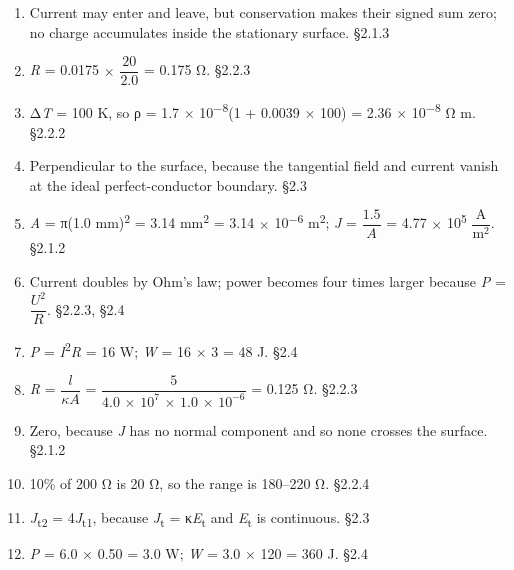 \documentclass[11pt]{article}
\begin{document}
\begin{keepsection}
\begin{enumerate}
\item Current may enter and leave, but conservation makes their signed sum zero; no charge accumulates inside the stationary surface. \hfill{\small\color{FAUblue}§2.1.3}
\item \textit{R} = 0.0175 \ensuremath{\times} {\small\ensuremath{\dfrac{20}{2.0}}} = 0.175 Ω. \hfill{\small\color{FAUblue}§2.2.3}
\item Δ\textit{T} = 100 K, so ρ = 1.7 \ensuremath{\times} 10\textsuperscript{\ensuremath{-}8}(1 + 0.0039 \ensuremath{\times} 100) = 2.36 \ensuremath{\times} 10\textsuperscript{\ensuremath{-}8} Ω m. \hfill{\small\color{FAUblue}§2.2.2}
\item Perpendicular to the surface, because the tangential field and current vanish at the ideal perfect-conductor boundary. \hfill{\small\color{FAUblue}§2.3}
\item \textit{A} = π(1.0 mm)\textsuperscript{2} = 3.14 mm\textsuperscript{2} = 3.14 \ensuremath{\times} 10\textsuperscript{\ensuremath{-}6} m\textsuperscript{2}; \textit{J} = {\small\ensuremath{\dfrac{1.5}{{A}}}} = 4.77 \ensuremath{\times} 10\textsuperscript{5} {\small\ensuremath{\dfrac{\mathrm{A}}{\mathrm{m}^{2}}}}. \hfill{\small\color{FAUblue}§2.1.2}
\item Current doubles by Ohm’s law; power becomes four times larger because \textit{P} = {\small\ensuremath{\dfrac{{U}^{2}}{{R}}}}. \hfill{\small\color{FAUblue}§2.2.3, §2.4}
\item \textit{P} = \textit{I}\textsuperscript{2}\textit{R} = 16 W; \textit{W} = 16 \ensuremath{\times} 3 = 48 J. \hfill{\small\color{FAUblue}§2.4}
\item \textit{R} = {\small\ensuremath{\dfrac{{l}}{κ{A}}}} = {\small\ensuremath{\dfrac{5}{4.0\, \times \, 10^{7}\, \times \, 1.0\, \times \, 10^{-6}}}} = 0.125 Ω. \hfill{\small\color{FAUblue}§2.2.3}
\item Zero, because \textit{J} has no normal component and so none crosses the surface. \hfill{\small\color{FAUblue}§2.1.2}
\item 10\% of 200 Ω is 20 Ω, so the range is 180–220 Ω. \hfill{\small\color{FAUblue}§2.2.4}
\item \textit{J}\textsubscript{t2} = 4\textit{J}\textsubscript{t1}, because \textit{J}\textsubscript{t} = κ\textit{E}\textsubscript{t} and \textit{E}\textsubscript{t} is continuous. \hfill{\small\color{FAUblue}§2.3}
\item \textit{P} = 6.0 \ensuremath{\times} 0.50 = 3.0 W; \textit{W} = 3.0 \ensuremath{\times} 120 = 360 J. \hfill{\small\color{FAUblue}§2.4}
\end{enumerate}

\end{keepsection}
\end{document}
